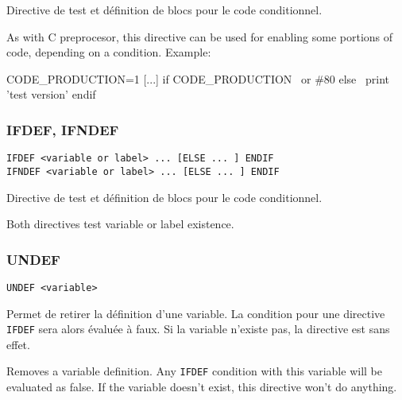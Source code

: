 \begin{xfr}
Directive de test et définition de blocs pour le code conditionnel.
\end{xfr}

\begin{xen}
As with C preprocesor, this directive can be used for enabling some portions of code, depending on a condition.
Example:
\end{xen}

\begin{code}
CODE\_PRODUCTION=1
[...]
if CODE\_PRODUCTION
\  or \#80
else
\  print 'test version'
endif
\end{code}

\subsubsection{IFDEF, IFNDEF}
\begin{verbatim}
IFDEF <variable or label> ... [ELSE ... ] ENDIF
IFNDEF <variable or label> ... [ELSE ... ] ENDIF
\end{verbatim}

\begin{xfr}
Directive de test et définition de blocs pour le code conditionnel.
\end{xfr}

\begin{xen}
Both directives test variable or label existence.
\end{xen}

\subsubsection{UNDEF}
\begin{verbatim}
UNDEF <variable>
\end{verbatim}

\begin{xfr}
Permet de retirer la définition d'une variable.
La condition pour une directive \texttt{IFDEF} sera alors évaluée à faux.
Si la variable n'existe pas, la directive est sans effet.
\end{xfr}

\begin{xen}
Removes a variable definition. Any \texttt{IFDEF} condition with this variable will be evaluated as false.
If the variable doesn't exist, this directive won't do anything.
\end{xen}

